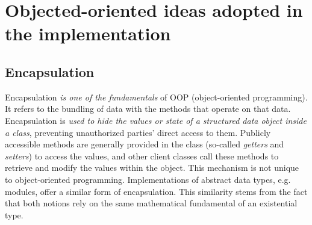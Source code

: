 \documentclass[a4paper]{report}
\begin{document}
\section{Objected-oriented ideas adopted in the implementation}
\subsection{Encapsulation}
Encapsulation \emph{is one of the fundamentals} of OOP (object-oriented programming). It refers to the bundling of data with the methods that operate on that data. Encapsulation is \emph{used to hide the values or state of a structured data object inside a class}, preventing unauthorized parties' direct access to them. Publicly accessible methods are generally provided in the class (so-called \emph{getters} and \emph{setters}) to access the values, and other client classes call these methods to retrieve and modify the values within the object. 
This mechanism is not unique to object-oriented programming. Implementations of abstract data types, e.g. modules, offer a similar form of encapsulation. This similarity stems from the fact that both notions rely on the same mathematical fundamental of an existential type.
\end{document}
